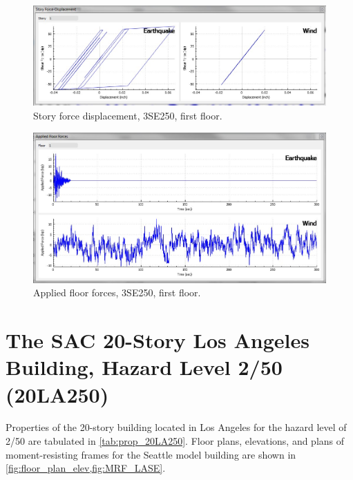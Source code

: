 \documentclass{simcenterdocumentation}
\begin{document}
\begin{figure}[H]
	\centering \includegraphics[scale=0.35]{3SE250_sfd.JPG}
	\caption{Story force displacement, 3SE250, first floor.}
\end{figure}
\begin{figure}[H]
	\centering \includegraphics[scale=0.35]{3SE250_aff.JPG}
	\caption{Applied floor forces, 3SE250, first floor.}
\end{figure}





\section{The SAC 20-Story Los Angeles Building, Hazard Level 2/50 (20LA250)}
Properties of the 20-story building located in Los Angeles for the hazard level of 2/50 are tabulated in \cref{tab:prop_20LA250}. Floor plans, elevations, and plans of moment-resisting frames for the Seattle model building are shown in \cref{fig:floor_plan_elev,fig:MRF_LASE}.
\end{document}
